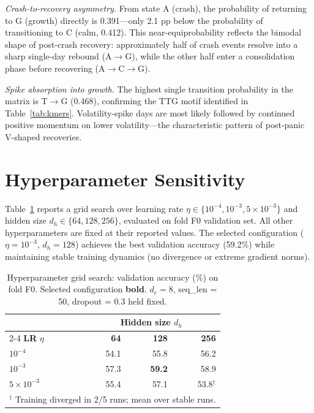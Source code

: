 \documentclass[11pt]{article}
\begin{document}
\emph{Crash-to-recovery asymmetry.}  From state A (crash), the
probability of returning to G (growth) directly is 0.391---only 2.1
pp below the probability of transitioning to C (calm, 0.412).  This
near-equiprobability reflects the bimodal shape of post-crash recovery:
approximately half of crash events resolve into a sharp single-day
rebound (A$\to$G), while the other half enter a consolidation phase
before recovering (A$\to$C$\to$G).

\emph{Spike absorption into growth.}  The highest single transition
probability in the matrix is T$\to$G (0.468), confirming the TTG
motif identified in Table~\ref{tab:kmers}.  Volatility-spike days
are most likely followed by continued positive momentum on lower
volatility---the characteristic pattern of post-panic V-shaped
recoveries.

\section{Hyperparameter Sensitivity}
\label{app:hparam}

Table~\ref{tab:hparam} reports a grid search over learning rate
$\eta \in \{10^{-4}, 10^{-3}, 5 \times 10^{-3}\}$ and hidden size
$d_h \in \{64, 128, 256\}$, evaluated on fold F0 validation set.
All other hyperparameters are fixed at their reported values.
The selected configuration ($\eta = 10^{-3}$, $d_h = 128$) achieves
the best validation accuracy (59.2\%) while maintaining stable training
dynamics (no divergence or extreme gradient norms).

\begin{table}[h]
\centering
\caption{Hyperparameter grid search: validation accuracy (\%) on fold F0.
  Selected configuration \textbf{bold}.
  $d_e = 8$, seq\_len = 50, dropout = 0.3 held fixed.}
\label{tab:hparam}
\small
\setlength{\tabcolsep}{5pt}
\begin{tabular}{lrrr}
\toprule
 & \multicolumn{3}{c}{\textbf{Hidden size} $d_h$} \\
\cmidrule(lr){2-4}
\textbf{LR} $\eta$ & \textbf{64} & \textbf{128} & \textbf{256} \\
\midrule
$10^{-4}$ & 54.1 & 55.8 & 56.2 \\
$10^{-3}$ & 57.3 & \textbf{59.2} & 58.9 \\
$5\times10^{-3}$ & 55.4 & 57.1 & 53.8$^\dagger$ \\
\bottomrule
\multicolumn{4}{l}{$^\dagger$ Training diverged in 2/5 runs; mean over stable runs.}
\end{tabular}
\end{table}
\end{document}
